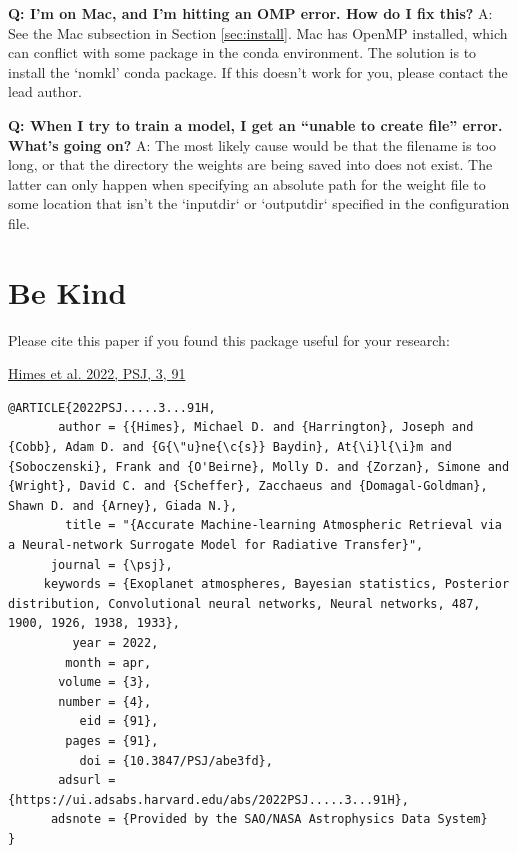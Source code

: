 \documentclass[letterpaper, 12pt]{article}
\begin{document}

\noindent \textbf{Q: I'm on Mac, and I'm hitting an OMP error.  How do 
I fix this?}  A: See the Mac subsection in Section \ref{sec:install}.  Mac has 
OpenMP installed, which can conflict with some package in the conda 
environment.  The solution is to install the `nomkl' conda package.  
If this doesn't work for you, please contact the lead author.  \newline

\noindent \textbf{Q: When I try to train a model, I get an ``unable to create 
file'' error.  What's going on?}  A: The most likely cause would be that the 
filename is too long, or that the directory the weights are being saved into 
does not exist.  The latter can only happen when specifying an absolute path 
for the weight file to some location that isn't the `inputdir` or `outputdir` 
specified in the configuration file.


\section{Be Kind}
\label{sec:bekind}
Please cite this paper if you found this package useful for your research:

\href{https://iopscience.iop.org/article/10.3847/PSJ/abe3fd/meta}{Himes et al. 2022, PSJ, 3, 91}

\begin{verbatim}
@ARTICLE{2022PSJ.....3...91H,
       author = {{Himes}, Michael D. and {Harrington}, Joseph and {Cobb}, Adam D. and {G{\"u}ne{\c{s}} Baydin}, At{\i}l{\i}m and {Soboczenski}, Frank and {O'Beirne}, Molly D. and {Zorzan}, Simone and {Wright}, David C. and {Scheffer}, Zacchaeus and {Domagal-Goldman}, Shawn D. and {Arney}, Giada N.},
        title = "{Accurate Machine-learning Atmospheric Retrieval via a Neural-network Surrogate Model for Radiative Transfer}",
      journal = {\psj},
     keywords = {Exoplanet atmospheres, Bayesian statistics, Posterior distribution, Convolutional neural networks, Neural networks, 487, 1900, 1926, 1938, 1933},
         year = 2022,
        month = apr,
       volume = {3},
       number = {4},
          eid = {91},
        pages = {91},
          doi = {10.3847/PSJ/abe3fd},
       adsurl = {https://ui.adsabs.harvard.edu/abs/2022PSJ.....3...91H},
      adsnote = {Provided by the SAO/NASA Astrophysics Data System}
}
\end{verbatim}
\end{document}
